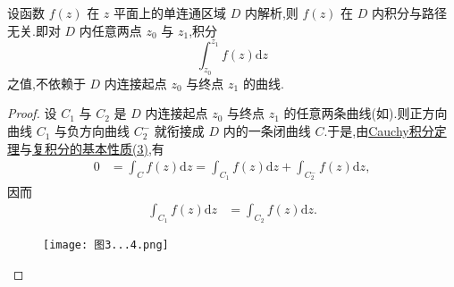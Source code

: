 \documentclass[../../main.tex]{subfiles}
\begin{document}
\begin{corollary}\label{corollary:复积分的积分与路径无关}
设函数 $f(z)$ 在 $z$ 平面上的单连通区域 $D$ 内解析,则 $f(z)$ 在 $D$ 内积分与路径无关.即对 $D$ 内任意两点 $z_0$ 与 $z_1$,积分
$$\int_{z_0}^{z_1} f(z) \mathrm{d}z$$
之值,不依赖于 $D$ 内连接起点 $z_0$ 与终点 $z_1$ 的曲线.
\end{corollary}
\begin{proof}
设 $C_1$ 与 $C_2$ 是 $D$ 内连接起点 $z_0$ 与终点 $z_1$ 的任意两条曲线(如).则正方向曲线 $C_1$ 与负方向曲线 $C_2^-$ 就衔接成 $D$ 内的一条闭曲线 $C$.于是,由\hyperref[theorem:Cauchy-Goursat定理(Cauchy积分定理)]{Cauchy积分定理}与\hyperref[proposition:复积分的基本性质]{复积分的基本性质(3)},有
\begin{align*}
0 &= \int_{C} f(z) \mathrm{d}z = \int_{C_1} f(z) \mathrm{d}z + \int_{C_2^-} f(z) \mathrm{d}z, 
\end{align*}
因而
\begin{align*}
\int_{C_1} f(z) \mathrm{d}z &= \int_{C_2} f(z) \mathrm{d}z. 
\end{align*}
\begin{figure}[H]
\centering
\texttt{[image: 图3...4.png]}
\caption{}
\label{figure:图3...4}
\end{figure}

\end{proof}
\end{document}
